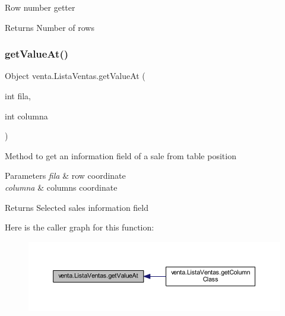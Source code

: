 Row number getter \begin{DoxyReturn}{Returns}
Number of rows 
\end{DoxyReturn}
\mbox{\label{classventa_1_1_lista_ventas_a49bbca6b55f15602ea06e0401ae84792}} 
\subsubsection{\texorpdfstring{get\+Value\+At()}{getValueAt()}}
{\footnotesize\ttfamily Object venta.\+Lista\+Ventas.\+get\+Value\+At (\begin{DoxyParamCaption}\item[{int}]{fila,  }\item[{int}]{columna }\end{DoxyParamCaption})}

Method to get an information field of a sale from table position 
\begin{DoxyParams}{Parameters}
{\em fila} & row coordinate \\
\hline
{\em columna} & columns coordinate \\
\hline
\end{DoxyParams}
\begin{DoxyReturn}{Returns}
Selected sales\textquotesingle{} information field 
\end{DoxyReturn}
Here is the caller graph for this function\+:
\nopagebreak
\begin{figure}[H]
\begin{center}
\leavevmode
\includegraphics[width=350pt]{classventa_1_1_lista_ventas_a49bbca6b55f15602ea06e0401ae84792_icgraph}
\end{center}
\end{figure}
\mbox{\label{classventa_1_1_lista_ventas_ae3dd8941eee7b0e14309add4764d3d1a}} 
